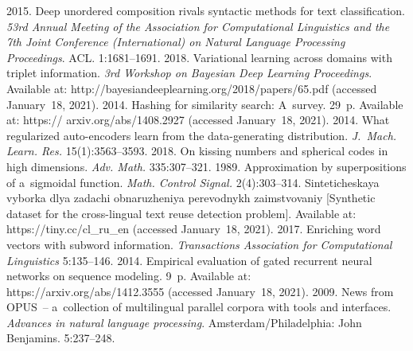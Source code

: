 \begin{multicols}{2}
{{\begin{thebibliography}{99}
2015. Deep unordered composition rivals syntactic methods for text classification. 
\textit{53rd Annual Meeting of the Association for Computational Linguistics and the
 7th  Joint Conference (International) on Natural Language Processing Proceedings}. ACL. 1:1681--1691.
 2018. Variational learning across domains with triplet information. 
 \textit{3rd Workshop on Bayesian Deep Learning Proceedings}. 
 Available at: {\sf http://bayesiandeeplearning.org/2018/\linebreak papers/65.pdf} (accessed January~18, 2021).
 2014. Hashing for similarity search: A~survey. 29~p. Available at: 
 {\sf https:// arxiv.org/abs/1408.2927} (accessed January~18, 2021).
2014. What regularized auto-encoders learn from the data-generating distribution. 
\textit{J.~Mach. Learn. Res.} 15(1):3563--3593.
 2018. 
On kissing numbers and spherical codes in high dimensions. \textit{Adv. Math.} 335:307--321.
 1989. Approximation by superpositions of a~sigmoidal function. 
 \textit{Math. Control Signal.} 2(4):303--314.
Sinteticheskaya vyborka dlya zadachi obnaruzheniya perevodnykh zaimstvovaniy
 [Synthetic dataset for the cross-lingual text reuse detection problem]. 
 Available at: {\sf https://tiny.cc/cl\_ru\_en} (accessed January~18, 2021).
 2017. Enriching word vectors with subword information. 
 \textit{Transactions Association for Computational Linguistics} 5:135--146.
 2014. Empirical evaluation of gated recurrent neural networks on sequence modeling. 9~p. 
 Available at: {\sf https://\linebreak arxiv.org/abs/1412.3555} (accessed January~18, 2021).
 2009. News from OPUS~-- a~collection of multilingual parallel corpora with tools and interfaces. 
 \textit{Advances in natural language 
processing}. Amsterdam/Philadelphia: John Benjamins. 5:237--248.
 \end{thebibliography}

 }
 }

\end{multicols}

